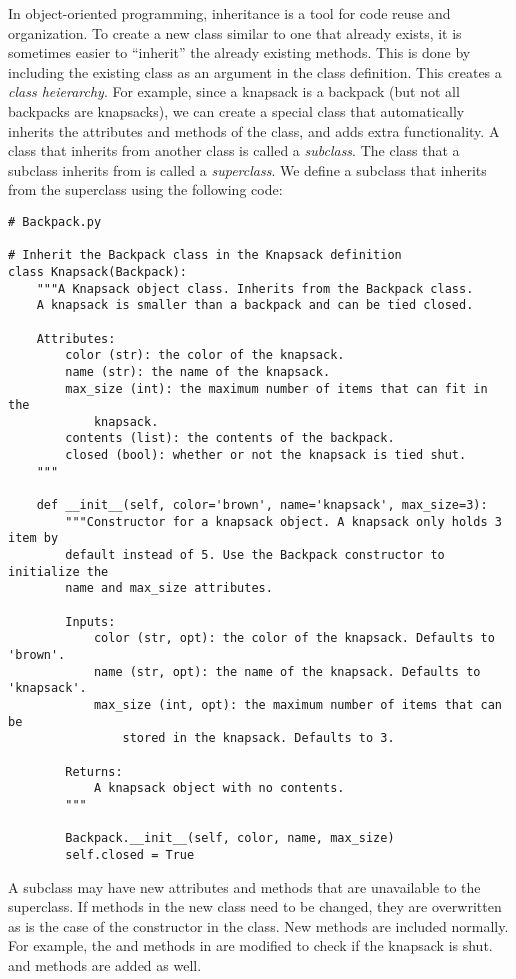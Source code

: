 In object-oriented programming, inheritance is a tool for code reuse and organization.
To create a new class similar to one that already exists, it is sometimes easier to ``inherit'' the already existing methods.
This is done by including the existing class as an argument in the class definition.
This creates a \emph{class heierarchy}.
For example, since a knapsack is a backpack (but not all backpacks are knapsacks), we can create a special  class that automatically inherits the attributes and methods of the  class, and adds extra functionality.
A class that inherits from another class is called a \emph{subclass}.
The class that a subclass inherits from is called a \emph{superclass}.
We define a  subclass that inherits from the  superclass using the following code:

\begin{lstlisting}
# Backpack.py

# Inherit the Backpack class in the Knapsack definition
class Knapsack(Backpack):
    """A Knapsack object class. Inherits from the Backpack class.
    A knapsack is smaller than a backpack and can be tied closed.
    
    Attributes:
        color (str): the color of the knapsack.
        name (str): the name of the knapsack.
        max_size (int): the maximum number of items that can fit in the
            knapsack.
        contents (list): the contents of the backpack.
        closed (bool): whether or not the knapsack is tied shut.
    """
    
    def __init__(self, color='brown', name='knapsack', max_size=3):
        """Constructor for a knapsack object. A knapsack only holds 3 item by
        default instead of 5. Use the Backpack constructor to initialize the
        name and max_size attributes.
        
        Inputs:
            color (str, opt): the color of the knapsack. Defaults to 'brown'.
            name (str, opt): the name of the knapsack. Defaults to 'knapsack'.
            max_size (int, opt): the maximum number of items that can be
                stored in the knapsack. Defaults to 3.
        
        Returns:
            A knapsack object with no contents.
        """
        
        Backpack.__init__(self, color, name, max_size)
        self.closed = True
\end{lstlisting}

A subclass may have new attributes and methods that are unavailable to the superclass.
If methods in the new class need to be changed, they are overwritten as is the case of the constructor in the  class.
New methods are included normally.
For example, the  and  methods in  are modified to check if the knapsack is shut. 
 and  methods are added as well.

